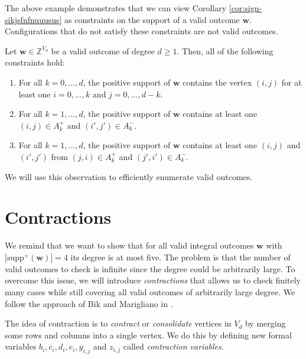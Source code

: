 The above example demonstrates that we can view Corollary \ref{cor:sign-sikjsfnfnuuusus} as constraints on the support of a valid outcome \( \mathbf{w} \). Configurations that do not satisfy these constraints are not valid outcomes.

\begin{corollary}
    Let \( \mathbf{w} \in \mathbb{Z}^{V_d} \) be a valid outcome of degree \( d \geq 1 \). Then, all of the following constraints hold:
    \begin{enumerate}
        \item For all \( k = 0, \dots, d \), the positive support of \( \mathbf{w} \) contains the vertex \( (i,j) \) for at least one \( i = 0, \dots, k \) and \( j = 0, \dots, d - k \).
        \item For all \( k = 1, \dots, d \), the positive support of \( \mathbf{w} \) contains at least one \( (i,j) \in A_k^+ \) and \( (i',j') \in A_k^- \).
        \item For all \( k = 1, \dots, d \), the positive support of \( \mathbf{w} \) contains at least one \( (i,j) \) and \( (i',j') \) from \( (j,i) \in A_k^+ \) and \( (j',i') \in A_k^- \).
    \end{enumerate}
\end{corollary}

We will use this observation to efficiently enumerate valid outcomes.

\section{Contractions}

We remind that we want to show that for all valid integral outcomes \( \mathbf w \) with \( |\mathrm{supp}^+(\mathbf w)| = 4 \) its degree is at most five. The problem is that the number of valid outcomes to check is infinite since the degree could be arbitrarily large. To overcome this issue, we will introduce \emph{contractions} that allows us to check finitely many cases while still covering all valid outcomes of arbitrarily large degree. We follow the approach of Bik and Marigliano in \cite{bik2022classifying}.

The idea of contraction is to \emph{contract} or \emph{consolidate} vertices in \( V_d \) by merging some rows and columns into a single vertex. We do this by defining new formal variables \( b_{i}, c_{i}, d_{i}, e_{i}, y_{i,j} \) and \( z_{i,j} \) called \emph{contraction variables}. 


